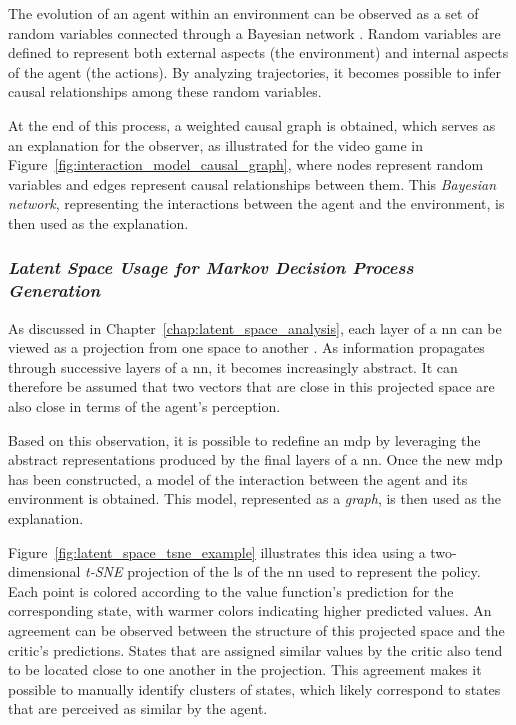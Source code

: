 The evolution of an agent within an environment can be observed as a set of random variables connected through a Bayesian network \parencite{madumal2020explainable}.
Random variables are defined to represent both external aspects (the environment) and internal aspects of the agent (the actions).
By analyzing trajectories, it becomes possible to infer causal relationships among these random variables.

At the end of this process, a weighted causal graph is obtained, which serves as an explanation for the observer, as illustrated for the video game \StarCraftIIName in Figure~\ref{fig:interaction_model_causal_graph}, where nodes represent random variables and edges represent causal relationships between them.
This \textit{Bayesian network}, representing the interactions between the agent and the environment, is then used as the explanation.



\subsubsection{\textit{Latent Space Usage for Markov Decision Process Generation}}
\label{subsubsec:latent_space_mdp_generation}

As discussed in Chapter~\ref{chap:latent_space_analysis}, each layer of a \gls{nn} can be viewed as a projection from one space to another \parencite{zahavy2017graying}.
As information propagates through successive layers of a \gls{nn}, it becomes increasingly abstract.
It can therefore be assumed that two vectors that are close in this projected space are also close in terms of the agent's perception.

Based on this observation, it is possible to redefine an \gls{mdp} by leveraging the abstract representations produced by the final layers of a \gls{nn}.
Once the new \gls{mdp} has been constructed, a model of the interaction between the agent and its environment is obtained.
This model, represented as a \textit{graph}, is then used as the explanation.

Figure~\ref{fig:latent_space_tsne_example} illustrates this idea using a two-dimensional \textit{t-SNE} projection of the \gls{ls} of the \gls{nn} used to represent the policy.
Each point is colored according to the value function's prediction for the corresponding state, with warmer colors indicating higher predicted values.
An agreement can be observed between the structure of this projected space and the critic's predictions.
States that are assigned similar values by the critic also tend to be located close to one another in the projection.
This agreement makes it possible to manually identify clusters of states, which likely correspond to states that are perceived as similar by the agent.


